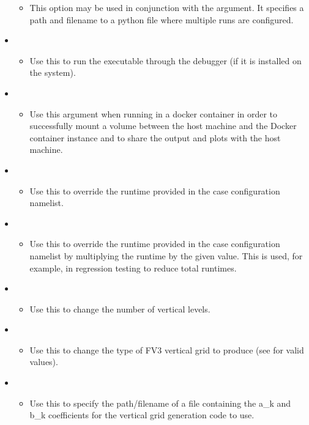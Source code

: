 \begin{itemize}
\begin{itemize}
	\item This option may be used in conjunction with the  argument. It specifies a path and filename to a python file where multiple runs are configured.
	\end{itemize}
\item {}
	\begin{itemize}
	\item Use this to run the executable through the  debugger (if it is installed on the system).
	\end{itemize}
\item {}
	\begin{itemize}
	\item Use this argument when running in a docker container in order to successfully mount a volume between the host machine and the Docker container instance and to share the output and plots with the host machine.
	\end{itemize}
\item {}
	\begin{itemize}
	\item Use this to override the runtime provided in the case configuration namelist.
	\end{itemize}
\item {}
	\begin{itemize}
	\item Use this to override the runtime provided in the case configuration namelist by multiplying the runtime by the given value. This is used, for example, in regression testing to reduce total runtimes.
	\end{itemize}
\item {}
	\begin{itemize}
	\item Use this to change the number of vertical levels.
	\end{itemize}
\item {}
	\begin{itemize}
	\item Use this to change the type of FV3 vertical grid to produce (see  for valid values).
	\end{itemize}
\item {}
	\begin{itemize}
	\item Use this to specify the path/filename of a file containing the a\_k and b\_k coefficients for the vertical grid generation code to use.

\end{itemize}
\end{itemize}

